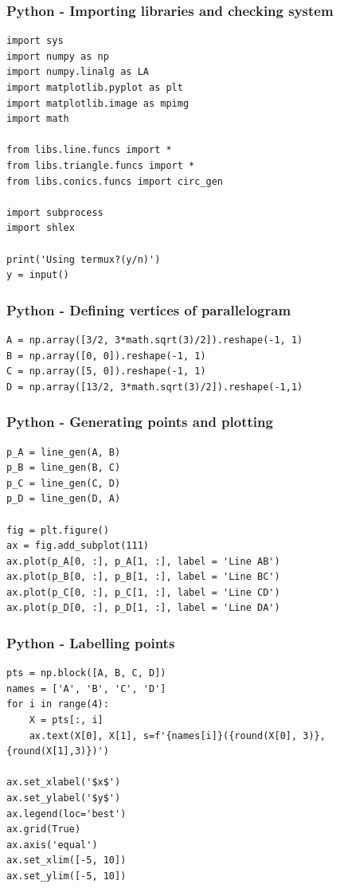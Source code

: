 \documentclass{beamer}
\begin{document}
\begin{frame}[fragile]
    \frametitle{Python - Importing libraries and checking system}
    \begin{lstlisting}
import sys
import numpy as np
import numpy.linalg as LA
import matplotlib.pyplot as plt
import matplotlib.image as mpimg
import math

from libs.line.funcs import *
from libs.triangle.funcs import *
from libs.conics.funcs import circ_gen

import subprocess
import shlex

print('Using termux?(y/n)')
y = input()
\end{lstlisting}
\end{frame}

\begin{frame}[fragile]
    \frametitle{Python - Defining vertices of parallelogram}
    \begin{lstlisting}
A = np.array([3/2, 3*math.sqrt(3)/2]).reshape(-1, 1)
B = np.array([0, 0]).reshape(-1, 1)
C = np.array([5, 0]).reshape(-1, 1)
D = np.array([13/2, 3*math.sqrt(3)/2]).reshape(-1,1)
\end{lstlisting}
\end{frame}

\begin{frame}[fragile]
    \frametitle{Python - Generating points and plotting}
    \begin{lstlisting}
p_A = line_gen(A, B)
p_B = line_gen(B, C)
p_C = line_gen(C, D)
p_D = line_gen(D, A)

fig = plt.figure()
ax = fig.add_subplot(111)
ax.plot(p_A[0, :], p_A[1, :], label = 'Line AB')
ax.plot(p_B[0, :], p_B[1, :], label = 'Line BC')
ax.plot(p_C[0, :], p_C[1, :], label = 'Line CD')
ax.plot(p_D[0, :], p_D[1, :], label = 'Line DA')
\end{lstlisting}
\end{frame}

\begin{frame}[fragile]
    \frametitle{Python - Labelling points}
    \begin{lstlisting}
pts = np.block([A, B, C, D])
names = ['A', 'B', 'C', 'D']
for i in range(4):
    X = pts[:, i]
    ax.text(X[0], X[1], s=f'{names[i]}({round(X[0], 3)}, {round(X[1],3)})')

ax.set_xlabel('$x$')
ax.set_ylabel('$y$')
ax.legend(loc='best')
ax.grid(True) 
ax.axis('equal')
ax.set_xlim([-5, 10])
ax.set_ylim([-5, 10])
    \end{lstlisting}
\end{frame}
\end{document}
